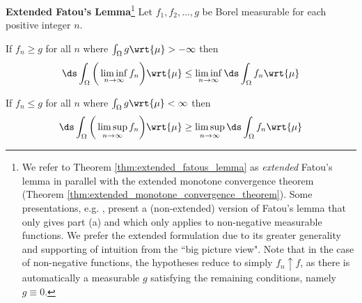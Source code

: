 \documentclass{article} %
\newcommand{\dint}{\ds\int}
\newcommand{\dmu}{\wrt{\mu}}
\begin{document}
\begin{theorem}{\textbf{Extended Fatou's Lemma}\footnote{We refer to Theorem \ref{thm:extended_fatous_lemma} as \textit{extended} Fatou's lemma in parallel with the extended monotone convergence theorem (Theorem \ref{thm:extended_monotone_convergence_theorem}).  Some presentations, e.g. \cite{folland1999real}, present a (non-extended) version of Fatou's lemma that only gives part (a) and which only applies to non-negative measurable functions.  We prefer the extended formulation due to its greater generality and supporting of intuition from the ``big picture view".  Note that in the case of non-negative functions, the hypotheses reduce to simply $f_n \uparrow f$, as there is automatically a measurable $g$ satisfying the remaining conditions, namely $g \equiv 0$. }}
Let $f_1, f_2, ..., g$ be Borel measurable for each positive integer $n$. 
\begin{alphabate}
\item If $f_n \geq g$ for all $n$ where $\int_\Omega g \dmu > -\infty$ then 
\begin{align} 
\ds\int_\Omega \bigg( \liminf_{n \to \infty} f_n \bigg) \dmu \leq \liminf_{n \to \infty} \dint_\Omega f_n \dmu
\label{eqn:fatous_lemma_with_infs}
\end{align}
\item If $f_n \leq g$ for all $n$ where $\int_\Omega g \dmu < \infty$ then 
\begin{align} 
\ds\int_\Omega \bigg( \limsup_{n \to \infty} f_n \bigg) \dmu \geq \limsup_{n \to \infty} \dint_\Omega f_n \dmu
\label{eqn:fatous_lemma_with_sups}
\end{align}
\end{alphabate}
\label{thm:extended_fatous_lemma}
\end{theorem}
\end{document}
